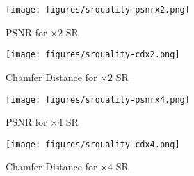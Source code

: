 

\begin{figure*}[t]
    \small
    \centering
    \begin{minipage}{.48\textwidth}
    \centering
    \texttt{[image: figures/srquality-psnrx2.png]}
    \vspace{-.3in}
    \caption{PSNR for $\times2$ SR}
    \label{fig:srquality-psnrx2}    
    \vspace{-.1in}
    \end{minipage}
    \hfill
    \begin{minipage}{.48\textwidth}
    \centering
    \texttt{[image: figures/srquality-cdx2.png]}
    \vspace{-.3in}
    \caption{ Chamfer Distance for $\times2$ SR}
    \label{fig:srquality-cdx2}  
    \vspace{-.1in}
    \end{minipage}
\end{figure*}

\begin{figure*}[t]
    \small
    \centering
    \begin{minipage}{.48\textwidth}
    \centering
    \texttt{[image: figures/srquality-psnrx4.png]}
    \vspace{-.3in}
    \caption{PSNR for $\times4$ SR}
    \label{fig:srquality-psnrx4}    
    \vspace{-.1in}
    \end{minipage}
    \hfill
    \begin{minipage}{.48\textwidth}
    \centering
    \texttt{[image: figures/srquality-cdx4.png]}
    \vspace{-.3in}
    \caption{Chamfer Distance for $\times4$ SR}
    \label{fig:srquality-cdx4}  
    \vspace{-.1in}
    \end{minipage}
\end{figure*}

